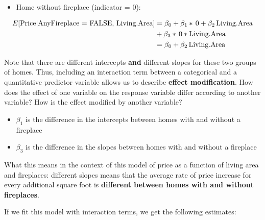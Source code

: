\documentclass[
]{book}
\newenvironment{Shaded}{\begin{snugshade}}{\end{snugshade}}
\newcommand{\KeywordTok}[1]{\textcolor[rgb]{0.13,0.29,0.53}{\textbf{#1}}}
\newcommand{\NormalTok}[1]{#1}
\newcommand{\OperatorTok}[1]{\textcolor[rgb]{0.81,0.36,0.00}{\textbf{#1}}}
\newcommand{\StringTok}[1]{\textcolor[rgb]{0.31,0.60,0.02}{#1}}
\providecommand{\tightlist}{%
  \setlength{\itemsep}{0pt}\setlength{\parskip}{0pt}}
\begin{document}
\begin{itemize}
\tightlist
\item
  Home without fireplace (indicator = 0):
\end{itemize}

\begin{align*}
E[\hbox{Price}| \hbox{AnyFireplace = FALSE, Living.Area}] &= \beta_0 + \beta_1*\,0 + \beta_2\,\hbox{Living.Area}\\
&+ \beta_3*\,0*\hbox{Living.Area}\\
&= \beta_0  + \beta_2\,\hbox{Living.Area}\\
\end{align*}

Note that there are different intercepts \textbf{and} different slopes for these two groups of homes. Thus, including an interaction term between a categorical and a quantitative predictor variable allows us to describe \textbf{effect modification}. How does the effect of one variable on the response variable differ according to another variable? How is the effect modified by another variable?

\begin{itemize}
\tightlist
\item
  \(\beta_1\) is the difference in the intercepts between homes with and without a fireplace
\item
  \(\beta_3\) is the difference in the slopes between homes with and without a fireplace
\end{itemize}

What this means in the context of this model of price as a function of living area and fireplaces: different slopes means that the average rate of price increase for every additional square foot is \textbf{different between homes with and without fireplaces}.

If we fit this model with interaction terms, we get the following estimates:

\begin{Shaded}
\end{Shaded}
\end{document}
